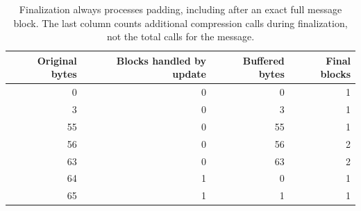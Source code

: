 \begin{table}[!ht]
  \centering
  \begin{tabular}{r r r r}
    \toprule
    Original bytes & Blocks handled by update & Buffered bytes & Final blocks \\
    \midrule
    0              & 0                        & 0              & 1            \\
    3              & 0                        & 3              & 1            \\
    55             & 0                        & 55             & 1            \\
    56             & 0                        & 56             & 2            \\
    63             & 0                        & 63             & 2            \\
    64             & 1                        & 0              & 1            \\
    65             & 1                        & 1              & 1            \\
    \bottomrule
  \end{tabular}
  \caption{Finalization always processes padding, including after an exact full message block. The last column counts additional compression calls during finalization, not the total calls for the message.}
  \label{tab:revision-sha-padding}
\end{table}
